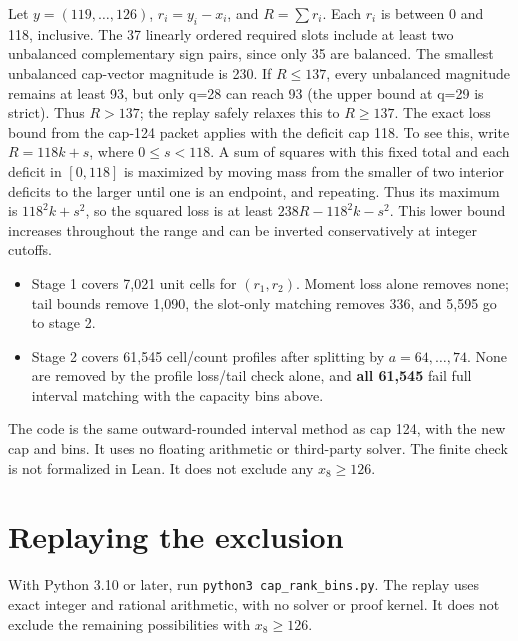 \documentclass[11pt,letterpaper]{article}
\providecommand{\tightlist}{\setlength{\itemsep}{0pt}\setlength{\parskip}{0pt}}
\begin{document}
Let \(y=(119,\ldots,126)\), \(r_i=y_i-x_i\), and \(R=\sum r_i\). Each
\(r_i\) is between 0 and 118, inclusive. The 37 linearly ordered
required slots include at least two unbalanced complementary sign pairs,
since only 35 are balanced. The smallest unbalanced cap-vector magnitude
is 230. If \(R\le137\), every unbalanced magnitude remains at least 93,
but only q=28 can reach 93 (the upper bound at q=29 is strict). Thus
\(R>137\); the replay safely relaxes this to \(R\ge137\). The exact loss
bound from the cap-124 packet applies with the deficit cap 118. To see this,
write \(R=118k+s\), where \(0\le s<118\). A sum of squares with this
fixed total and each deficit in \([0,118]\) is maximized by moving
mass from the smaller of two interior deficits to the larger until
one is an endpoint, and repeating. Thus its maximum is
\(118^2 k+s^2\), so the squared loss is at least
\(238R-118^2 k-s^2\). This lower bound increases throughout the
range and can be inverted conservatively at integer cutoffs.

\begin{itemize}
\tightlist
\item
  Stage 1 covers 7,021 unit cells for \((r_1,r_2)\). Moment loss alone
  removes none; tail bounds remove 1,090, the slot-only matching removes
  336, and 5,595 go to stage 2.
\item
  Stage 2 covers 61,545 cell/count profiles after splitting by
  \(a=64,\ldots,74\). None are removed by the profile loss/tail check
  alone, and \textbf{all 61,545} fail full interval matching with the
  capacity bins above.
\end{itemize}

The code is the same outward-rounded interval method as cap 124, with
the new cap and bins. It uses no floating arithmetic or third-party
solver. The finite check is not formalized in Lean. It does not exclude
any \(x_8\ge126\).


\section{Replaying the exclusion}
With Python 3.10 or later, run \texttt{python3 cap\_rank\_bins.py}.
The replay uses exact integer and rational arithmetic, with no solver or
proof kernel. It does not exclude the remaining possibilities with
\(x_8\ge126\).
\end{document}
